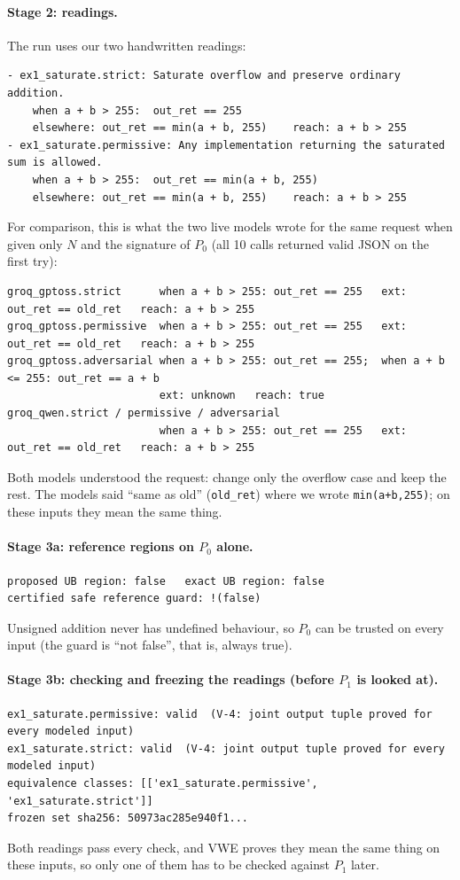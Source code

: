 \documentclass[10pt,a4paper]{article}
\newcommand{\Pz}{P_0}\newcommand{\Po}{P_1}
\begin{document}
\paragraph{Stage 2: readings.} The run uses our two handwritten readings:
\begin{lstlisting}[language={}]
- ex1_saturate.strict: Saturate overflow and preserve ordinary addition.
    when a + b > 255:  out_ret == 255
    elsewhere: out_ret == min(a + b, 255)    reach: a + b > 255
- ex1_saturate.permissive: Any implementation returning the saturated sum is allowed.
    when a + b > 255:  out_ret == min(a + b, 255)
    elsewhere: out_ret == min(a + b, 255)    reach: a + b > 255
\end{lstlisting}
For comparison, this is what the two live models wrote for the same request when given only $N$
and the signature of $\Pz$ (all 10 calls returned valid JSON on the first try):
\begin{lstlisting}[language={}]
groq_gptoss.strict      when a + b > 255: out_ret == 255   ext: out_ret == old_ret   reach: a + b > 255
groq_gptoss.permissive  when a + b > 255: out_ret == 255   ext: out_ret == old_ret   reach: a + b > 255
groq_gptoss.adversarial when a + b > 255: out_ret == 255;  when a + b <= 255: out_ret == a + b
                        ext: unknown   reach: true
groq_qwen.strict / permissive / adversarial
                        when a + b > 255: out_ret == 255   ext: out_ret == old_ret   reach: a + b > 255
\end{lstlisting}
Both models understood the request: change only the overflow case and keep the rest. The models
said ``same as old'' (\texttt{old\_ret}) where we wrote \texttt{min(a+b,255)}; on these inputs
they mean the same thing.

\paragraph{Stage 3a: reference regions on $\Pz$ alone.}\mbox{}\par
\begin{lstlisting}[language={}]
proposed UB region: false   exact UB region: false
certified safe reference guard: !(false)
\end{lstlisting}
Unsigned addition never has undefined behaviour, so $\Pz$ can be trusted on every input (the guard
is ``not false'', that is, always true).

\paragraph{Stage 3b: checking and freezing the readings (before $\Po$ is looked at).}\mbox{}\par
\begin{lstlisting}[language={}]
ex1_saturate.permissive: valid  (V-4: joint output tuple proved for every modeled input)
ex1_saturate.strict: valid  (V-4: joint output tuple proved for every modeled input)
equivalence classes: [['ex1_saturate.permissive', 'ex1_saturate.strict']]
frozen set sha256: 50973ac285e940f1...
\end{lstlisting}
Both readings pass every check, and VWE proves they mean the same thing on these inputs, so only
one of them has to be checked against $\Po$ later.
\end{document}
